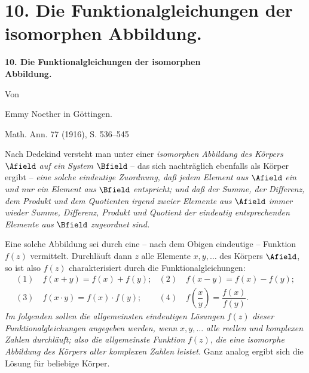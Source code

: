 \section*{10. Die Funktionalgleichungen der isomorphen Abbildung.}
\begin{center}
{\Large\bfseries 10. Die Funktionalgleichungen der isomorphen\\ Abbildung.}\par
\vspace{0.75em}
Von\par
\vspace{0.75em}
Emmy Noether in Göttingen.\par
\vspace{1em}
Math. Ann. 77 (1916), S. 536--545
\end{center}

\vspace{3em}

Nach Dedekind versteht man unter einer \emph{isomorphen Abbildung des Körpers} \(\Afield\) \emph{auf ein System} \(\Bfield\) -- das sich nachträglich ebenfalls als Körper ergibt -- \emph{eine solche eindeutige Zuordnung, daß jedem Element aus} \(\Afield\) \emph{ein und nur ein Element aus} \(\Bfield\) \emph{entspricht; und daß der Summe, der Differenz, dem Produkt und dem Quotienten irgend zweier Elemente aus} \(\Afield\) \emph{immer wieder Summe, Differenz, Produkt und Quotient der eindeutig entsprechenden Elemente aus} \(\Bfield\) \emph{zugeordnet sind.}

Eine solche Abbildung sei durch eine -- nach dem Obigen eindeutige -- Funktion \(f(z)\) vermittelt. Durchläuft dann \(z\) alle Elemente \(x,y,\ldots\) des Körpers \(\Afield\), so ist also \(f(z)\) charakterisiert durch die Funktionalgleichungen:
\[
\begin{array}{ll}
(1)\quad f(x+y)=f(x)+f(y); & (2)\quad f(x-y)=f(x)-f(y);\\[0.45em]
(3)\quad f(x\cdot y)=f(x)\cdot f(y); & (4)\quad f\!\left(\dfrac{x}{y}\right)=\dfrac{f(x)}{f(y)}.
\end{array}
\]
\emph{Im folgenden sollen die allgemeinsten eindeutigen Lösungen} \(f(z)\) \emph{dieser Funktionalgleichungen angegeben werden, wenn} \(x,y,\ldots\) \emph{alle reellen und komplexen Zahlen durchläuft; also die allgemeinste Funktion} \(f(z)\), \emph{die eine isomorphe Abbildung des Körpers aller komplexen Zahlen leistet.} Ganz analog ergibt sich die Lösung für beliebige Körper.

